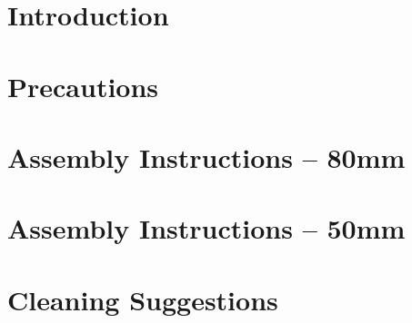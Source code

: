 \documentclass{tower-manual}
\begin{document}
\blankpage

\tableofcontents

\newpage
\blankpage


\section{Introduction}

\lipsum[1-2]

\newpage

\section{Precautions}



\newpage

\section{Assembly Instructions -- 80mm}



\clearpage

\section{Assembly Instructions -- 50mm}



\clearpage

\section{Cleaning Suggestions}


\end{document}
